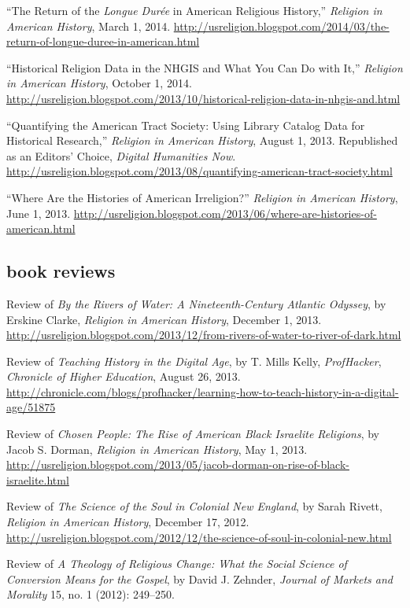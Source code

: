 \documentclass[11pt]{article}
\begin{document}
  ``The Return of the \emph{Longue Durée} in American Religious History,'' 
  \emph{Religion in American History}, March 1, 2014. \url{http://usreligion.blogspot.com/2014/03/the-return-of-longue-duree-in-american.html}

  ``Historical Religion Data in the NHGIS and What You Can Do with It,'' 
  \emph{Religion in American History}, October 1, 2014.  
  \url{http://usreligion.blogspot.com/2013/10/historical-religion-data-in-nhgis-and.html}

  ``Quantifying the American Tract Society: Using Library Catalog Data for 
  Historical Research,'' \emph{Religion in American History}, August 1, 
  2013. Republished as an Editors' Choice, \emph{Digital Humanities Now}. 
  \url{http://usreligion.blogspot.com/2013/08/quantifying-american-tract-society.html}

  ``Where Are the Histories of American Irreligion?'' \emph{Religion in 
    American History}, June 1, 2013. 
  \url{http://usreligion.blogspot.com/2013/06/where-are-histories-of-american.html}

  \subsection{book reviews}

  Review of \emph{By the Rivers of Water: A Nineteenth-Century Atlantic 
    Odyssey}, by Erskine Clarke, \emph{Religion in American History}, December 
  1, 2013. 
  \url{http://usreligion.blogspot.com/2013/12/from-rivers-of-water-to-river-of-dark.html}

  Review of \emph{Teaching History in the Digital Age}, by T. Mills Kelly, 
  \emph{ProfHacker}, \emph{Chronicle of Higher Education}, August 26, 
  2013. 
  \url{http://chronicle.com/blogs/profhacker/learning-how-to-teach-history-in-a-digital-age/51875}

  Review of \emph{Chosen People: The Rise of American Black Israelite 
    Religions}, by Jacob S. Dorman, \emph{Religion in American History},
  May 1, 2013.  
  \url{http://usreligion.blogspot.com/2013/05/jacob-dorman-on-rise-of-black-israelite.html} 

  Review of \emph{The Science of the Soul in Colonial New England}, by Sarah 
  Rivett, \emph{Religion in American History}, December 17, 2012. 
  \url{http://usreligion.blogspot.com/2012/12/the-science-of-soul-in-colonial-new.html}

  Review of \emph{A Theology of Religious Change: What the Social Science
    of Conversion Means for the Gospel}, by David J. Zehnder, \emph{Journal
    of Markets and Morality} 15, no. 1 (2012): 249--250.
\end{document}
